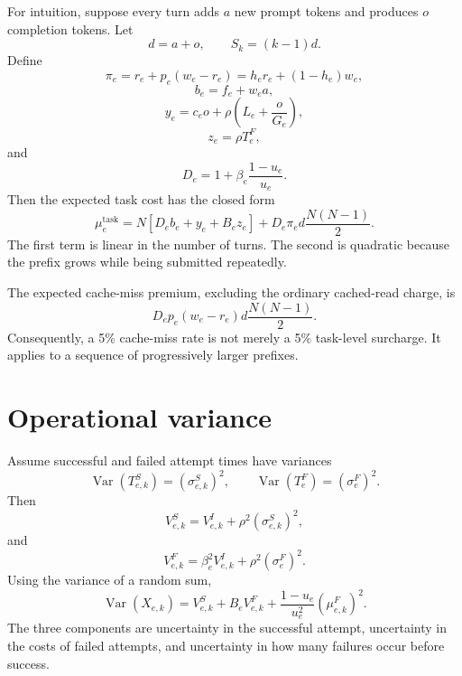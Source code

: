 \documentclass[11pt]{article}
\newcommand{\Var}{\operatorname{Var}}
\begin{document}
For intuition, suppose every turn adds $a$ new prompt tokens and produces $o$
completion tokens. Let
\begin{equation}
d=a+o,
\qquad
S_k=(k-1)d.
\end{equation}
Define
\begin{equation}
\pi_e
=r_e+p_e(w_e-r_e)
=h_er_e+(1-h_e)w_e,
\end{equation}
\begin{equation}
b_e=f_e+w_ea,
\end{equation}
\begin{equation}
y_e=c_eo+\rho\left(L_e+\frac{o}{G_e}\right),
\end{equation}
\begin{equation}
z_e=\rho T_e^F,
\end{equation}
and
\begin{equation}
D_e=1+\beta_e\frac{1-u_e}{u_e}.
\end{equation}
Then the expected task cost has the closed form
\begin{equation}
\boxed{
\mu_e^{\mathrm{task}}
=N\left[D_eb_e+y_e+B_ez_e\right]
+D_e\pi_ed\frac{N(N-1)}{2}
}.
\end{equation}
The first term is linear in the number of turns. The second is quadratic because
the prefix grows while being submitted repeatedly.

The expected cache-miss premium, excluding the ordinary cached-read charge, is
\begin{equation}
\boxed{
D_ep_e(w_e-r_e)d\frac{N(N-1)}{2}
}.
\end{equation}
Consequently, a 5\% cache-miss rate is not merely a 5\% task-level surcharge. It
applies to a sequence of progressively larger prefixes.

\section{Operational variance}

Assume successful and failed attempt times have variances
\begin{equation}
\Var(T_{e,k}^S)=(\sigma_{e,k}^S)^2,
\qquad
\Var(T_e^F)=(\sigma_e^F)^2.
\end{equation}
Then
\begin{equation}
V_{e,k}^S=V_{e,k}^I+\rho^2(\sigma_{e,k}^S)^2,
\end{equation}
and
\begin{equation}
V_{e,k}^F=\beta_e^2V_{e,k}^I+\rho^2(\sigma_e^F)^2.
\end{equation}
Using the variance of a random sum,
\begin{equation}
\boxed{
\Var(X_{e,k})
=V_{e,k}^S+B_eV_{e,k}^F
+\frac{1-u_e}{u_e^2}\left(\mu_{e,k}^F\right)^2
}.
\end{equation}
The three components are uncertainty in the successful attempt, uncertainty in
the costs of failed attempts, and uncertainty in how many failures occur before
success.
\end{document}
